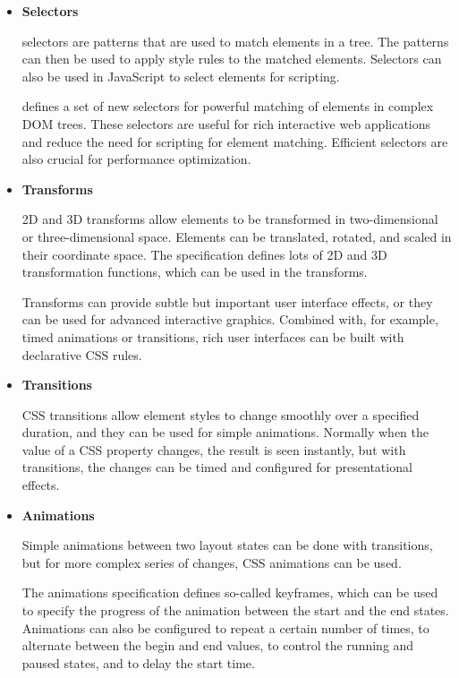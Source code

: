 \begin{itemize}

\item \textbf{Selectors}

   selectors are patterns that are used to match elements in
  a  tree. The patterns can then be used to apply style
  rules to the matched elements. Selectors can also be used in
  JavaScript to select elements for scripting.

   defines a set of new selectors \cite{CSS3Selectors} for
  powerful matching of elements in complex DOM trees. These selectors
  are useful for rich interactive web applications and reduce the need
  for scripting for element matching. Efficient selectors are also
  crucial for performance optimization.

\item \textbf{Transforms}

  2D and 3D transforms \cite{CSStransforms} allow elements to be
  transformed in two-dimensional or three-dimensional space. Elements
  can be translated, rotated, and scaled in their coordinate
  space. The specification defines lots of 2D and 3D transformation
  functions, which can be used in the transforms.

  Transforms can provide subtle but important user interface effects,
  or they can be used for advanced interactive graphics. Combined
  with, for example, timed animations or transitions, rich user
  interfaces can be built with declarative CSS rules.

\item \textbf{Transitions}

  CSS transitions \cite{CSStransitions} allow element styles to change
  smoothly over a specified duration, and they can be used for simple
  animations. Normally when the value of a CSS property changes, the
  result is seen instantly, but with transitions, the changes can be
  timed and configured for presentational effects.

\item \textbf{Animations}

  Simple animations between two layout states can be done with
  transitions, but for more complex series of changes, CSS animations
  \cite{CSSanimations} can be used.

  The animations specification defines so-called keyframes, which can
  be used to specify the progress of the animation between the start
  and the end states. Animations can also be configured to repeat a
  certain number of times, to alternate between the begin and end
  values, to control the running and paused states, and to delay the
  start time. \cite{CSSanimations}


\end{itemize}
